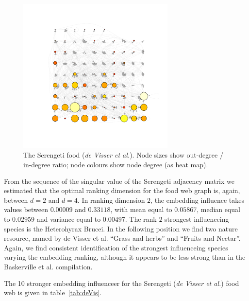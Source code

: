 \documentclass[12pt]{article}
\theoremstyle{definition}
\begin{document}
\begin{figure}[!ht]\label{fig:S_D}
\centering
\includegraphics[trim = 30mm 25mm 20mm 25mm, clip, width=0.7\textwidth]{Images/Graph_Serengeti_deVisser.pdf}
\caption{The Serengeti food (\textit{de Visser et al.}). Node sizes show out-degree / in-degree ratio;  node colours show node degree (as heat map). }
\end{figure}

From the sequence of the singular value of the Serengeti adjacency matrix we estimated that the optimal ranking dimension for the food web graph is, again, between $d = 2$ and $d=4$. In ranking dimension $2$, the embedding influence takes values between $0.00009$ and $0.33118$, with mean equal to $0.05867$, median equal to $0.02959$ and variance equal to $0.00497$. The rank $2$ strongest influenceing species is the Heterohyrax Brucei. In the following position we find two nature resource, named by de Visser et al. ``Grass and herbs'' and ``Fruits and Nectar''. Again, we find consistent identification of the strongest influenceing species varying the embedding ranking, although it appears to be less strong than in the Baskerville et al. compilation.

The 10 stronger embedding influenceer for the Serengeti (\textit{de Visser et al.}) food web is given in table~\ref{tab:deVis}.
\end{document}
